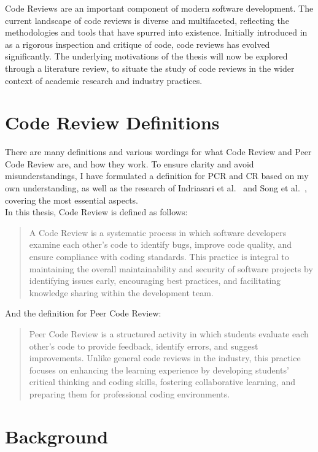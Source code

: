 Code Reviews are an important component of modern software development. The current landscape of code reviews is diverse and multifaceted, reflecting the methodologies and tools that have spurred into existence. Initially introduced in as a rigorous inspection and critique of code, code reviews has evolved significantly. The underlying motivations of the thesis will now be explored through a literature review, to situate the study of code reviews in the wider context of academic research and industry practices.\\


\section{Code Review Definitions}
There are many definitions and various wordings for what Code Review and Peer Code Review are, and how they work. To ensure clarity and avoid misunderstandings, I have formulated a definition for PCR and CR based on my own understanding, as well as the research of Indriasari et al.~\cite{Indriasari_Luxton_2020} and Song et al.~\cite{Song_Goldstein_Sakr_2020}, covering the most essential aspects. \\

\noindent In this thesis, Code Review is defined as follows: 
\begin{quote}
    A Code Review is a systematic process in which software developers examine each other's code to identify bugs, improve code quality, and ensure compliance with coding standards. This practice is integral to maintaining the overall maintainability and security of software projects by identifying issues early, encouraging best practices, and facilitating knowledge sharing within the development team.
\end{quote}
And the definition for Peer Code Review:
\begin{quote}
    Peer Code Review is a structured activity in which students evaluate each other's code to provide feedback, identify errors, and suggest improvements. Unlike general code reviews in the industry, this practice focuses on enhancing the learning experience by developing students' critical thinking and coding skills, fostering collaborative learning, and preparing them for professional coding environments. 
\end{quote}


\section{Background}

